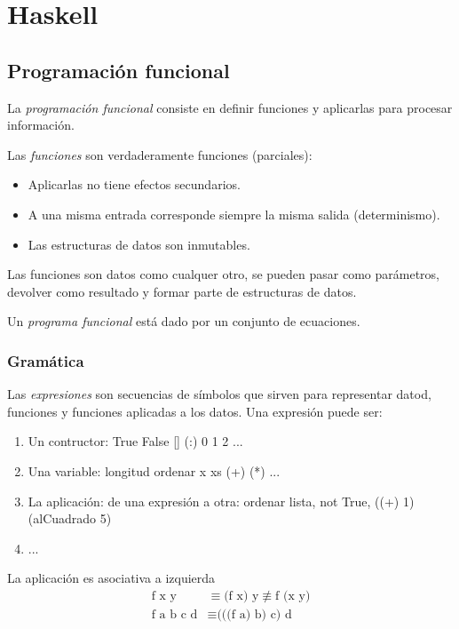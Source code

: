 \documentclass[12pt]{extarticle}
\begin{document}
\section{Haskell}
\subsection{Programación funcional}
La \textit{programación funcional} consiste en definir funciones y aplicarlas para procesar información.

Las \textit{funciones} son verdaderamente funciones (parciales):
\begin{itemize}
\itemsep-0.35em 
\item Aplicarlas no tiene efectos secundarios.
\item A una misma entrada corresponde siempre la misma salida (determinismo).
\item Las estructuras de datos son inmutables.
\end{itemize}

Las funciones son datos como cualquer otro, se pueden pasar como parámetros, devolver como resultado y formar parte de estructuras de datos.

Un \textit{programa funcional} está dado por un conjunto de ecuaciones.

\subsubsection{Gramática}
Las \textit{expresiones} son secuencias de símbolos que sirven para representar datod, funciones y funciones aplicadas a los datos. Una expresión puede ser:

\begin{enumerate}
\itemsep-0.35em 
\item Un contructor: True False [] (:) 0 1 2 ...
\item Una variable: longitud ordenar x xs (+) (*) ...
\item La aplicación: de una expresión a otra: ordenar lista,  not True,  ((+) 1) (alCuadrado 5)
\item ...
\end{enumerate}

La aplicación es asociativa a izquierda
\begin{equation}
\begin{split}
\text{f x y} & \equiv \text{(f x) y} 
\not\equiv \text{f (x y)} \\
\text{f a b c d} & \equiv \text{(((f a) b) c) d}
\end{split}
\end{equation}
\end{document}
